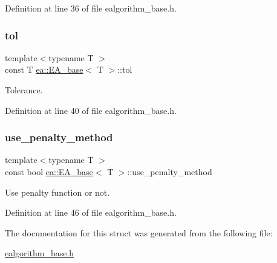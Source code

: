 Definition at line 36 of file ealgorithm\+\_\+base.\+h.

\mbox{\label{structea_1_1_e_a__base_a9b7a33797adc1cbeab7a9f3786c41a27}} 
\subsubsection{\texorpdfstring{tol}{tol}}
{\footnotesize\ttfamily template$<$typename T $>$ \\
const T \hyperlink{structea_1_1_e_a__base}{ea\+::\+E\+A\+\_\+base}$<$ T $>$\+::tol}



Tolerance. 



Definition at line 40 of file ealgorithm\+\_\+base.\+h.

\mbox{\label{structea_1_1_e_a__base_ad3b4a962208b72c67b663ba0d40bebfb}} 
\subsubsection{\texorpdfstring{use\+\_\+penalty\+\_\+method}{use\_penalty\_method}}
{\footnotesize\ttfamily template$<$typename T $>$ \\
const bool \hyperlink{structea_1_1_e_a__base}{ea\+::\+E\+A\+\_\+base}$<$ T $>$\+::use\+\_\+penalty\+\_\+method}



Use penalty function or not. 



Definition at line 46 of file ealgorithm\+\_\+base.\+h.



The documentation for this struct was generated from the following file\+:\begin{DoxyCompactItemize}
\item 
\hyperlink{ealgorithm__base_8h}{ealgorithm\+\_\+base.\+h}\end{DoxyCompactItemize}
